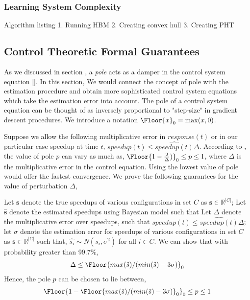 \subsubsection{Learning System Complexity}
Algorithm listing
1. Running HBM
2. Creating convex hull
3. Creating PHT

\subsection{Control Theoretic Formal Guarantees}
As we discussed in section \secref{}, a \emph{pole} acts as a damper in the
control system equation \eqref{}. In this section, We would connect the concept
of pole with the estimation procedure and obtain more sophisticated control
system equations which take the estimation error into account.
The pole of a control system equation can be thought of as inversely proportional
to "step-size" in gradient descent procedures. %
We introduce a notation $\Floor{x}_0 = \max(x,0)$.

Suppose we allow the following multiplicative error in $response(t)$ or in our
particular case speedup at time $t$, $speedup(t) \leq  \hat{speedup(t)} \Delta$.
According to \cite{}, the value of pole $p$ can vary as much as,
$\Floor{1-\frac{2}{\Delta})}_0\leq p \leq 1$, where $\Delta$ is the multiplicative
error in the control equation. Using the lowest value of pole would offer the
fastest convergence. We prove the following guarantees for the value of perturbation $\Delta$,

\begin{theorem}
Let $\mathbf{s}$ denote the true speedups of various configurations in set $C$ as $\mathbf{s} \in \mathbb{R}^{|C|}$; Let $\hat{\mathbf{s}}$ denote the estimated speedups using Bayesian model such that
Let $\Delta$ denote the multiplicative error over speedups, such that $speedup(t) \leq \hat{speedup(t)}\Delta $; let $\sigma$ denote the estimation error for speedups of various configurations in set $C$ as $\mathbf{s} \in \mathbb{R}^{|C|}$ such that, $\hat{s_i} \sim N(s_i, \sigma^2)$ for all $i \in C$. We can show that with probability greater than 99.7\%,
$$
\Delta \leq \Floor{max(\hat{s})/(min(\hat{s}) -  3\sigma)}_0
$$
Hence, the pole $p$ can be chosen to lie between, $$\Floor{1- \Floor{max(\hat{s})/(min(\hat{s}) -  3\sigma)}_0}_0 \leq p \leq 1$$
\end{theorem}

